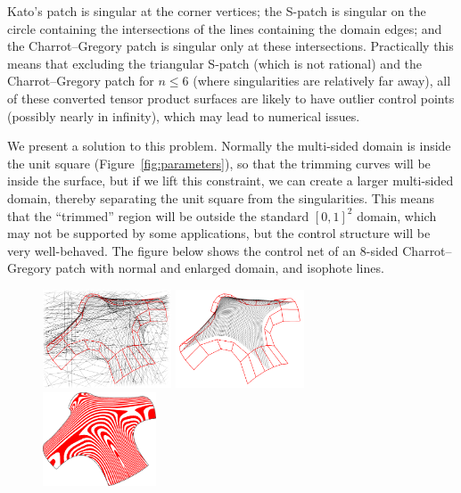 \documentclass{article}
\begin{document}
Kato's patch is singular at the corner vertices; the S-patch is singular on the circle containing
the intersections of the lines containing the domain edges; and the Charrot--Gregory patch is
singular only at these intersections. Practically this means that excluding the triangular S-patch
(which is not rational) and the Charrot--Gregory patch for $n\leq6$ (where singularities are
relatively far away), all of these converted tensor product surfaces are likely to have
outlier control points (possibly nearly in infinity), which may lead to numerical issues.

We present a solution to this problem. Normally the multi-sided domain is inside the unit
square (Figure~\ref{fig:parameters}), so that the trimming curves will be inside the
surface, but if we lift this constraint, we can create a larger multi-sided domain,
thereby separating the unit square from the singularities. This means that the ``trimmed''
region will be outside the standard $[0,1]^2$ domain, which may not be supported by some
applications, but the control structure will be very well-behaved. The figure below shows
the control net of an 8-sided Charrot--Gregory patch with normal and enlarged domain, and isophote
lines.
\begin{figure}[h!]
  \includegraphics[width = 0.34\textwidth]{images/8sided-1.png}
  \hfill
  \includegraphics[width = 0.34\textwidth]{images/8sided-2.png}
  \hfill
  \includegraphics[width = 0.3\textwidth]{images/8sided-3.png}
\end{figure}
\end{document}
